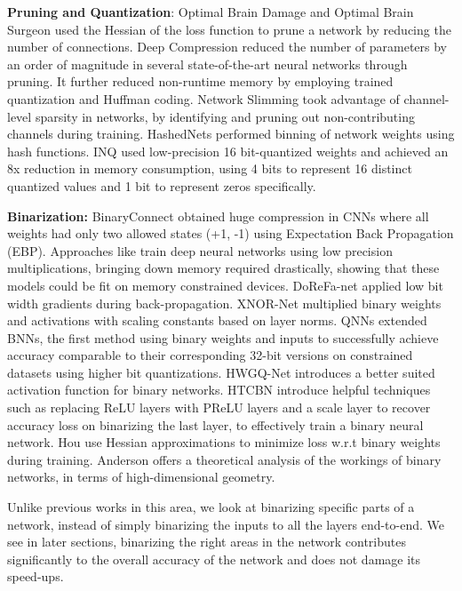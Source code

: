 \documentclass[10pt,twocolumn,letterpaper]{article}
\begin{document}
{\bf Pruning and Quantization}: Optimal Brain Damage \cite{Cunn1} and Optimal Brain Surgeon \cite{Hassibi} used the Hessian of the loss function to prune a network by reducing the number of connections. Deep Compression \cite{han2015deep} reduced the number of parameters by an order of magnitude in several state-of-the-art neural networks through pruning. It further reduced non-runtime memory by employing trained quantization and Huffman coding. Network Slimming \cite{liu2017learning} took advantage of channel-level sparsity in networks, by identifying and pruning out non-contributing channels during training. HashedNets \cite{chen2015hashed} performed binning of network weights using hash functions. INQ \cite{zhou2017inq} used low-precision 16 bit-quantized weights and achieved an 8x reduction in memory consumption, using 4 bits to represent 16 distinct quantized values and 1 bit to represent zeros specifically.

{\bf Binarization:}  BinaryConnect \cite{courbariaux2015binaryconnect} obtained huge compression in CNNs where all weights had only two allowed states (+1, -1) using Expectation Back Propagation (EBP). Approaches like \cite{hubara2016quantized, li2016ternary, zhu2016trained} train deep neural networks using low precision multiplications, bringing down memory required drastically, showing that these models could be fit on memory constrained devices. DoReFa-net \cite{zhou2016dorefa} applied low bit width gradients during back-propagation. XNOR-Net \cite{rastegari2016xnor} multiplied binary weights and activations with scaling constants based on layer norms. QNNs \cite{hubara2016quantized} extended BNNs\cite{courbariaux2016binarized}, the first method using binary weights and inputs to successfully achieve accuracy comparable to their corresponding 32-bit versions on constrained datasets using higher bit quantizations. HWGQ-Net \cite{cai2017deep} introduces a better suited activation function for binary networks. HTCBN \cite{tang2017train} introduce helpful techniques such as replacing ReLU layers with PReLU layers and a scale layer to recover accuracy loss on binarizing the last layer, to effectively train a binary neural network. Hou \etal \cite{hou2016loss} use Hessian approximations to minimize loss w.r.t binary weights during training. Anderson \etal \cite{anderson2017high} offers a theoretical analysis of the workings of binary networks, in terms of high-dimensional geometry.

Unlike previous works in this area, we look at binarizing specific parts of a network, instead of simply binarizing the inputs to all the layers end-to-end. We see in later sections, binarizing the right areas in the network contributes significantly to the overall accuracy of the network and does not damage its speed-ups. 
\end{document}
